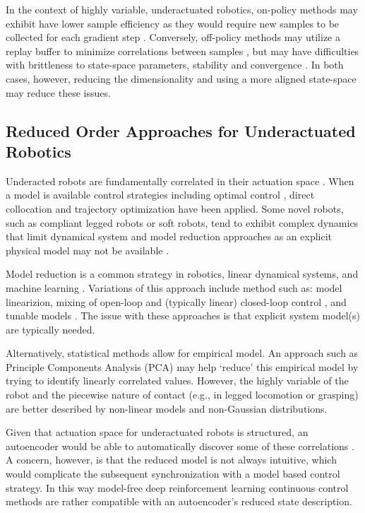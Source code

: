\documentclass[letterpaper, 10 pt, conference]{ieeeconf}
\begin{document}
In the context of highly variable, underactuated robotics, on-policy methods may exhibit have lower sample efficiency as they would require new samples to be collected for each gradient step \cite{SAC}.   Conversely, off-policy methods may utilize a replay buffer to minimize correlations between samples \cite{DDPG}, but may have difficulties with brittleness to state-space parameters, stability and convergence \cite{bhatnagar2009convergent}.  In both cases, however, reducing the dimensionality and using a more aligned state-space may reduce these issues. 


\subsection{Reduced Order Approaches for Underactuated Robotics}

Underacted robots are fundamentally correlated in their actuation space  \cite{tedrake2009underactuated}.
When a model is available control strategies including optimal control \cite{betts2010practical}, direct collocation \cite{von1993numerical} and trajectory optimization \cite{kalakrishnan2011stomp} have been applied.
Some novel robots, such as compliant legged robots or soft robots, tend to exhibit complex dynamics that limit dynamical system and model reduction approaches as an explicit physical model may not be available \cite{nakajima2015information}.

Model reduction is a common strategy in robotics, linear dynamical systems, and machine learning \cite{betts2010practical, sutton1998reinforcement}.   Variations of this approach include method such as: model linearizion, mixing of open-loop and (typically linear) closed-loop control \cite{kolter2010probabilistic}, and tunable models \cite{maeda2011tuned}.  The issue with these approaches is that explicit system model(s) are typically needed.  

Alternatively, statistical methods allow for empirical model.
An approach such as Principle Components Analysis (PCA) may help `reduce' this empirical model by trying to identify linearly correlated values.
However, the highly variable of the robot and the piecewise nature of contact (e.g., in legged locomotion or grasping) are better described by non-linear models and non-Gaussian distributions.  

Given that actuation space for underactuated robots is structured, an autoencoder would be able to automatically discover some of these correlations \cite{AE_hinton2006reducing, ngsparse}.
A concern, however, is that the reduced model is not always intuitive, which would complicate the subsequent synchronization with a model based control strategy.
In this way model-free deep reinforcement learning continuous control methods are rather compatible with an autoencoder's reduced state description.
\end{document}
